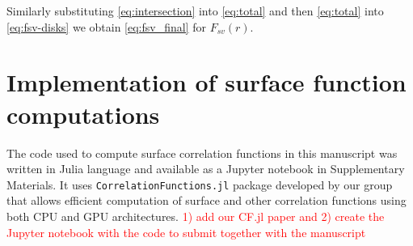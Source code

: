\documentclass[reprint,amsmath,amssymb,aps,pre,showkeys,showpacs]{revtex4-1}
\newcommand{\code}[1]{\colorbox{light-gray}{\texttt{#1}}}
\begin{document}
Similarly substituting \cref{eq:intersection} into \cref{eq:total} and then
\cref{eq:total} into \cref{eq:fsv-disks} we obtain \cref{eq:fsv_final} for
$F_{sv}(r)$.

\section{Implementation of surface function computations}
\label{ap:b_code}
The code used to compute surface correlation functions in this manuscript was
written in Julia language and available as a Jupyter notebook in Supplementary
Materials. It uses \code{CorrelationFunctions.jl} package developed by our group
\cite{CFsjlpaper} that allows efficient computation of surface and other
correlation functions using both CPU and GPU architectures. \textcolor{red}{1)
  add our CF.jl paper and 2) create the Jupyter notebook with the code to submit
  together with the manuscript}


\end{document}
